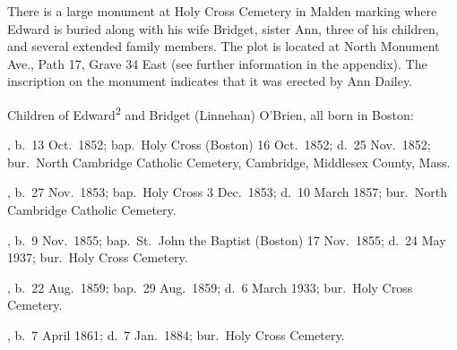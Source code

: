 There is a large monument at Holy Cross Cemetery in Malden marking where Edward is buried along with his wife Bridget, sister Ann, three of his children, and several extended family members. The plot is located at North Monument Ave., Path 17, Grave 34 East (see further information in the appendix).\cite{Edward2OBrienGrave} The inscription on the monument indicates that it was erected by Ann Dailey.\cite{AnnDaileyMonument}

\begin{KidsIntro}
	Children of Edward\textsuperscript{2} and Bridget (Linnehan) O'Brien, all born in Boston:
\end{KidsIntro}

\begin{Kids}
	, b.\ 13 Oct.\ 1852;\cite{MaryAnn3OBrienBirth:2} bap.\ Holy Cross (Boston) 16 Oct.\ 1852;\cite{MaryAnn3OBrienBaptism} d.\ 25 Nov.\ 1852;\cite{MaryAnn3OBrienDeath} bur.\ North Cambridge Catholic Cemetery, Cambridge, Middlesex County, Mass.\cite{DianaBerberenaLetter1:2}
	
	, b.\ 27 Nov.\ 1853;\cite{Ellen3OBrienBirth} bap.\ Holy Cross 3 Dec.\ 1853;\cite{Ellen3OBrienBaptism} d.\ 10 March 1857;\cite{Ellen3OBrienDeath} bur.\ North Cambridge Catholic Cemetery.\cite{DianaBerberenaLetter2:1}
	
	, b.\ 9 Nov.\ 1855;\cite{AnnMaria3OBrienBirth} bap.\ St.\ John the Baptist (Boston) 17 Nov.\ 1855\cite{AnnMaria3OBrienBaptism}; d.\ 24 May 1937;\cite{AnnMaria3OBrienDeath:2} bur.\ Holy Cross Cemetery.\cite{CarolGordon:5}
	
	, b.\ 22 Aug.\ 1859;\cite{Margaret3OBrien2Baptism:1} bap.\ 29 Aug.\ 1859;\cite{Margaret3OBrien2Baptism:2} d.\ 6 March 1933;\cite{Margaret3OBrien2Death:2} bur.\ Holy Cross Cemetery.\cite{CarolGordon:6}
	
	, b.\ 7 April 1861;\cite{Edward3OBrienBirth:2} d.\ 7 Jan.\ 1884;\cite{Edward3OBrienDeath} bur.\ Holy Cross Cemetery.\cite{CarolGordon:7}
\end{Kids}